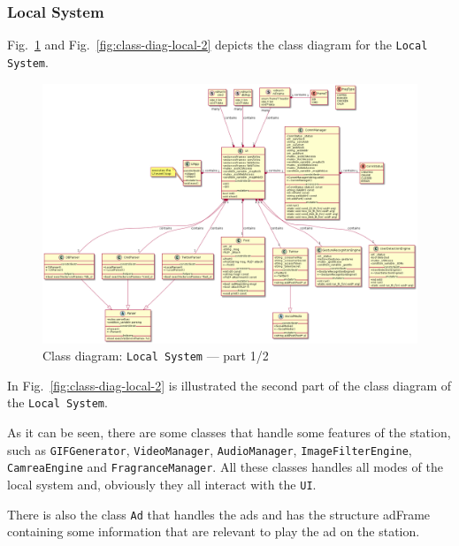 \subsubsection{Local System}
\label{sec:local-system-class}
%
Fig.~\ref{fig:class-diag-local-1} and Fig.~\ref{fig:class-diag-local-2} depicts the class diagram for the
\texttt{Local System}.
%
\begin{figure}[htb!]
\centering
    \includegraphics[width=1.0\columnwidth]{./img/class-diag-local-1.png}
  \caption{Class diagram: \texttt{Local System} --- part 1/2}%
\label{fig:class-diag-local-1}
\end{figure}

In Fig.~\ref{fig:class-diag-local-2} is illustrated the second part of the class diagram of the \texttt{Local System}.

As it can be seen, there are some classes that handle some features of the station, such as \texttt{GIFGenerator}, \texttt{VideoManager}, \texttt{AudioManager}, \texttt{ImageFilterEngine}, \texttt{CamreaEngine} and \texttt{FragranceManager}. All these classes handles all modes of the local system and, obviously they all interact with the \texttt{UI}.

There is also the class \texttt{Ad} that handles the ads and has the structure adFrame containing some information that are relevant to play the ad on the station.

